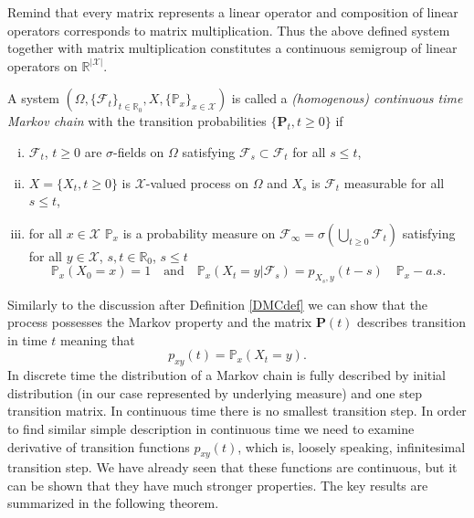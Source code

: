 Remind that every matrix represents a linear operator and composition of linear operators corresponds to matrix multiplication.
Thus the above defined system together with matrix multiplication constitutes a continuous semigroup of linear operators on $\mathbb{R}^{|\mathcal{X}|}$.
\begin{df}
\label{CMCdef}
A system $(\Omega,\{\mathcal{F}_{t}\}_{t\in\mathbb{R}_0},X,\{\mathbb{P}_x\}_{x\in\mathcal{X}})$ is called a {\em (homogenous) continuous time Markov chain} with the transition probabilities $\{\bm{P}_t,t\geq 0\}$ if
\begin{enumerate}[(i)]
\item $\mathcal{F}_t$, $t \geq 0$ are $\sigma$-fields on $\Omega$ satisfying $\mathcal{F}_s\subset \mathcal{F}_t$ for all $s\leq t$,
\item $X=\{X_t, t\geq0 \}$ is $\mathcal{X}$-valued process on $\Omega$ and $X_s$ is $\mathcal{F}_t$ measurable for all $s\leq t$,
\item for all $x\in\mathcal{X}$ $\mathbb{P}_x$ is a probability measure on $\mathcal{F}_\infty=\sigma\left(\bigcup_{t\geq0}\mathcal{F}_t \right)$ satisfying for all $y\in\mathcal{X}$, $s,t \in \mathbb{R}_0$, $s\leq t$
$$\mathbb{P}_x(X_0=x)=1 \quad \text{and} \quad \mathbb{P}_x(X_t=y|\mathcal{F}_s)=p_{X_s,y}(t-s) \quad \mathbb{P}_x-a.s.$$ 
\end{enumerate}
\end{df} 
Similarly to the discussion after Definition \ref{DMCdef} we can show that the process possesses the Markov property and the matrix $\bm{P}(t)$ describes transition in time $t$ meaning that
\[p_{xy}(t)=\mathbb{P}_x(X_t=y).\] 
In discrete time the distribution of a Markov chain is fully described by initial distribution (in our case represented by underlying measure) and one step transition matrix. In continuous time there is no smallest transition step. In order to find similar simple description in continuous time we need to examine derivative of transition functions $p_{xy}(t)$, which is, loosely speaking, infinitesimal transition step. We have already seen that these functions are continuous, but it can be shown that they have much stronger properties. The key results are summarized in the following theorem.
